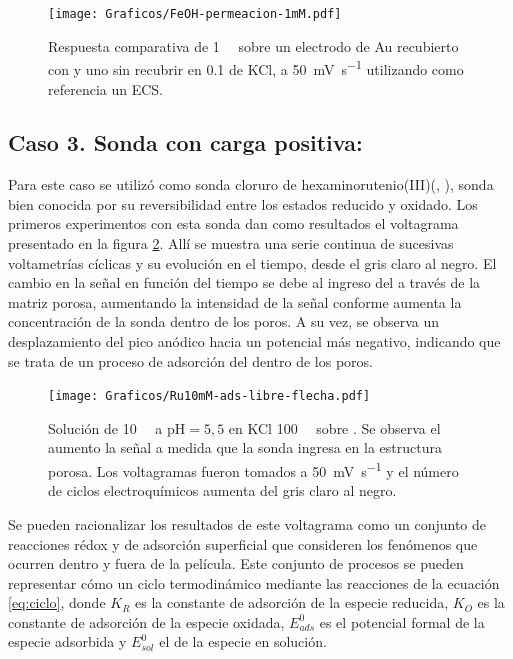 		\begin{figure}[ht]
				\centering
		 	    \texttt{[image: Graficos/FeOH-permeacion-1mM.pdf]}
		        \caption[Permeación ferroceno metanol en \pdmF]{Respuesta comparativa de \fc\space \SI{1}{\milli\Molar} sobre un electrodo de Au recubierto con \pdmF\space y uno sin recubrir en \SI{0.1}{\Molar} de KCl, a \SI{50}{\milli\volt\per\second} utilizando como referencia un ECS.}
		        \label{fig:permeacion}
		      	\end{figure}

	\subsection{Caso 3. Sonda con carga positiva: \texorpdfstring{\aminorutenioCompleto}{aminorutenio}}

		Para este caso se utilizó como sonda cloruro de hexaminorutenio(III)\linebreak (\aminorutenioCompleto, \ru), sonda bien conocida por su reversibilidad entre los estados reducido y oxidado. Los primeros experimentos con esta sonda dan como resultados el voltagrama presentado en la figura \ref{fig:primero-Ru10mM}. Allí se muestra una serie continua de sucesivas voltametrías cíclicas y su evolución en el tiempo, desde el gris claro al negro. El cambio en la señal en función del tiempo se debe al ingreso del \ru\space a través de la matriz porosa, aumentando la intensidad de la señal conforme aumenta la concentración de la sonda dentro de los poros. A su vez, se observa un desplazamiento del pico anódico hacia un potencial más negativo, indicando que se trata de un proceso de adsorción del \ru\space dentro de los poros. 
					
				\begin{figure}[t]
				\centering
				\texttt{[image: Graficos/Ru10mM-ads-libre-flecha.pdf]}
		        \caption{Solución de \ru\space \SI{10}{\milli\Molar} a $\text{pH}=5,5$ en KCl \SI{100}{\milli\Molar} sobre \pdmF. Se observa el aumento la señal a medida que la sonda ingresa en la estructura porosa. Los voltagramas fueron tomados a \SI{50}{\milli\volt\per\second} y el número de ciclos electroquímicos aumenta del gris claro al negro.}
		        \label{fig:primero-Ru10mM}
		        \end{figure}

		Se pueden racionalizar los resultados de este voltagrama como un conjunto de reacciones rédox y de adsorción superficial que consideren los fenómenos que ocurren dentro y fuera de la película. Este conjunto de procesos se pueden representar cómo un ciclo termodinámico mediante las reacciones de la ecuación \ref{eq:ciclo}, donde $K_R$ es la constante de adsorción de la especie reducida, $K_O$ es la constante de adsorción de la especie oxidada, $E^0_{ads}$ es el potencial formal de la especie adsorbida y $E^0_{sol}$ el de la especie en solución.\cite{ybarra2007}

